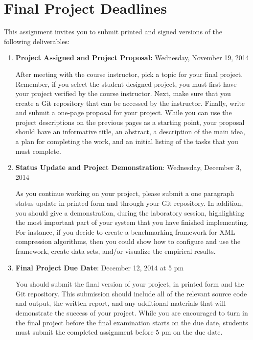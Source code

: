 \section*{Final Project Deadlines}

This assignment invites you to submit printed and signed versions of the following deliverables: 

\vspace*{-.05in}
\begin{enumerate}

  \itemsep0in

  \item {\bf Project Assigned and Project Proposal:} Wednesday, November 19, 2014

    After meeting with the course instructor, pick a topic for your final project.  Remember, if you select the
    student-designed project, you must first have your project verified by the course instructor.  Next, make sure that
    you create a Git repository that can be accessed by the instructor. Finally, write and submit a one-page proposal
    for your project. While you can use the project descriptions on the previous pages as a starting point, your
    proposal should have an informative title, an abstract, a description of the main idea, a plan for completing the
    work, and an initial listing of the tasks that you must complete.

  \item {\bf Status Update and Project Demonstration}: Wednesday, December 3, 2014

    As you continue working on your project, please submit a one paragraph status update in printed form and through
    your Git repository.  In addition, you should give a demonstration, during the laboratory session, highlighting the
    most important part of your system that you have finished implementing. For instance, if you decide to create a
    benchmarking framework for XML compression algorithms, then you could show how to configure and use the framework,
    create data sets, and/or visualize the empirical results.

  \item {\bf Final Project Due Date}: December 12, 2014 at 5 pm

    You should submit the final version of your project, in printed form and the Git repository. This submission should
    include all of the relevant source code and output, the written report, and any additional materials that will
    demonstrate the success of your project.  While you are encouraged to turn in the final project before the final
    examination starts on the due date, students must submit the completed assignment before 5 pm on the due date.

\end{enumerate}
\vspace*{-.05in}

